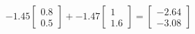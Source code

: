 \documentclass[preview]{standalone}
\begin{document}
\begin{align*}
-1.45 \begin{bmatrix} 0.8 \\ 0.5 \end{bmatrix} + -1.47 \begin{bmatrix} 1 \\ 1.6 \end{bmatrix} = \begin{bmatrix} -2.64 \\ -3.08 \end{bmatrix}
\end{align*}
\end{document}
